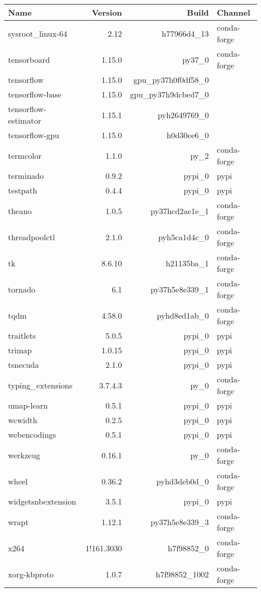 \begin{table}
	\begin{center}
		\begin{tabular}{|l|r|r|l|}
			\textbf{Name} &\textbf{Version} &\textbf{Build} &\textbf{Channel} \\
			\hline
			sysroot\_linux-64 &2.12 & h77966d4\_13 &conda-forge \\
			tensorboard &1.15.0 & py37\_0 &conda-forge \\
			tensorflow &1.15.0 & gpu\_py37h0f0df58\_0 & \\
			tensorflow-base &1.15.0 & gpu\_py37h9dcbed7\_0 & \\
			tensorflow-estimator &1.15.1 & pyh2649769\_0 & \\
			tensorflow-gpu &1.15.0 & h0d30ee6\_0 & \\
			termcolor &1.1.0 & py\_2 &conda-forge \\
			terminado &0.9.2 & pypi\_0 &pypi \\
			testpath &0.4.4 & pypi\_0 &pypi \\
			theano &1.0.5 & py37hcd2ae1e\_1 &conda-forge \\
			threadpoolctl &2.1.0 & pyh5ca1d4c\_0 &conda-forge \\
			tk &8.6.10 & h21135ba\_1 &conda-forge \\
			tornado &6.1 & py37h5e8e339\_1 &conda-forge \\
			tqdm &4.58.0 & pyhd8ed1ab\_0 &conda-forge \\
			traitlets &5.0.5 & pypi\_0 &pypi \\
			trimap &1.0.15 & pypi\_0 &pypi \\
			tsnecuda &2.1.0 & pypi\_0 &pypi \\
			typing\_extensions &3.7.4.3 & py\_0 &conda-forge \\
			umap-learn &0.5.1 & pypi\_0 &pypi \\
			wcwidth &0.2.5 & pypi\_0 &pypi \\
			webencodings &0.5.1 & pypi\_0 &pypi \\
			werkzeug &0.16.1 & py\_0 &conda-forge \\
			wheel &0.36.2 & pyhd3deb0d\_0 &conda-forge \\
			widgetsnbextension &3.5.1 & pypi\_0 &pypi \\
			wrapt &1.12.1 & py37h5e8e339\_3 &conda-forge \\
			x264 &1!161.3030 & h7f98852\_0 &conda-forge \\
			xorg-kbproto &1.0.7 & h7f98852\_1002 &conda-forge \\

\end{tabular}
\end{center}
\end{table}
